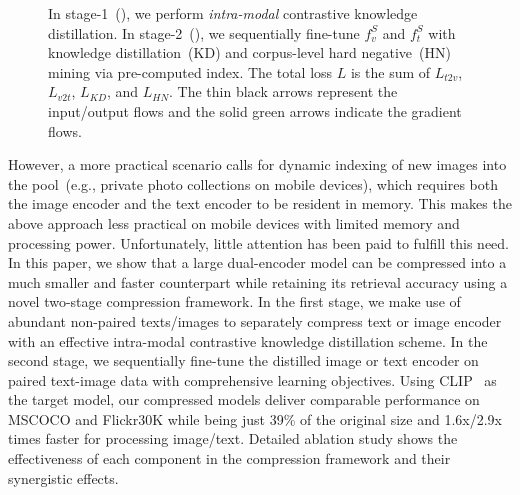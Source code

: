 \begin{figure}[t!]
	\centering
	\caption{In stage-1~(), we perform  \textit{intra-modal} contrastive knowledge distillation. In stage-2~(), we sequentially fine-tune  $f_v^{S}$ and $f_t^{S}$ with knowledge distillation~(KD) and corpus-level hard negative~(HN) mining via pre-computed index. The total loss $L$ is the sum of $L_{t2v}$, $L_{v2t}$, $L_{KD}$, and $L_{HN}$. The thin black arrows represent the input/output flows and 
the solid green arrows indicate the gradient flows.
	} \label{fig:overview}
\end{figure}

However, a more practical scenario calls for dynamic indexing of new images into the pool~(e.g., private photo collections on mobile devices),
which requires both the image encoder and the text encoder to be resident in memory. 
This makes the above approach less practical on mobile devices with limited
memory and processing power. 
Unfortunately, little attention has been paid to fulfill this need. 
In this paper, we show that a large dual-encoder model can be compressed into 
a much smaller and faster counterpart while retaining its retrieval accuracy 
using a novel two-stage compression framework. 
In the first stage, we make use of abundant non-paired texts/images to separately 
compress text or image encoder with an effective intra-modal contrastive knowledge 
distillation scheme. In the second stage, we sequentially fine-tune the distilled image or
text encoder on paired text-image data with comprehensive learning objectives.
Using CLIP~\cite{clip} as the target model, our compressed models deliver comparable performance on MSCOCO and Flickr30K while being just 39\% of the original size 
and 1.6x/2.9x times faster for processing image/text. 
Detailed ablation study shows the effectiveness of each component in the 
compression framework and their synergistic effects. 


